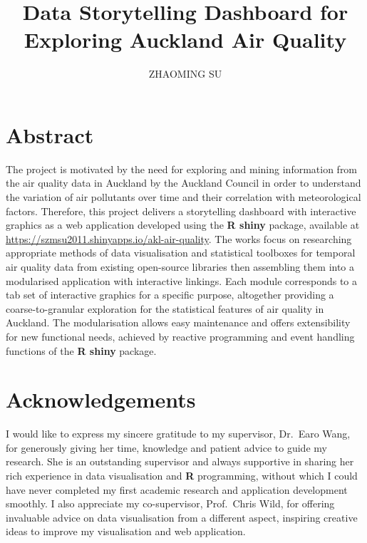 \documentclass{aucklandthesis}
\author{ZHAOMING SU}
\title{Data Storytelling Dashboard for Exploring Auckland Air Quality}
\begin{document}

\titlepage

{\rm\tighttoc\doublespacing}

\hypertarget{abstract}{%
\chapter*{Abstract}\label{abstract}}

The project is motivated by the need for exploring and mining information from the air quality data in Auckland by the Auckland Council in order to understand the variation of air pollutants over time and their correlation with meteorological factors. Therefore, this project delivers a storytelling dashboard with interactive graphics as a web application developed using the \textbf{R shiny} package, available at \url{https://szmsu2011.shinyapps.io/akl-air-quality}. The works focus on researching appropriate methods of data visualisation and statistical toolboxes for temporal air quality data from existing open-source libraries then assembling them into a modularised application with interactive linkings. Each module corresponds to a tab set of interactive graphics for a specific purpose, altogether providing a coarse-to-granular exploration for the statistical features of air quality in Auckland. The modularisation allows easy maintenance and offers extensibility for new functional needs, achieved by reactive programming and event handling functions of the \textbf{R shiny} package.

\newpage

\hypertarget{acknowledgements}{%
\chapter*{Acknowledgements}\label{acknowledgements}}

I would like to express my sincere gratitude to my supervisor, Dr.~Earo Wang, for generously giving her time, knowledge and patient advice to guide my research. She is an outstanding supervisor and always supportive in sharing her rich experience in data visualisation and \textbf{R} programming, without which I could have never completed my first academic research and application development smoothly. I also appreciate my co-supervisor, Prof.~Chris Wild, for offering invaluable advice on data visualisation from a different aspect, inspiring creative ideas to improve my visualisation and web application.
\end{document}
